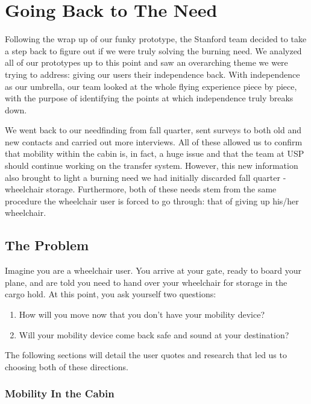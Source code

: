 \section{Going Back to The Need}
Following the wrap up of our funky prototype, the Stanford team decided to take a step back to figure out if we were truly solving the burning need. We analyzed all of our prototypes up to this point and saw an overarching theme we were trying to address: giving our users their independence back. With independence as our umbrella, our team looked at the whole flying experience piece by piece, with the purpose of identifying the points at which independence truly breaks down. 

We went back to our needfinding from fall quarter, sent surveys to both old and new contacts and carried out more interviews. All of these allowed us to confirm that mobility within the cabin is, in fact, a huge issue and that the team at USP should continue working on the transfer system. However, this new information also brought to light a burning need we had initially discarded fall quarter - wheelchair storage. Furthermore, both of these needs stem from the same procedure the wheelchair user is forced to go through: that of giving up his/her wheelchair. 

\subsection{The Problem}

Imagine you are a wheelchair user. You arrive at your gate, ready to board your plane, and are told you need to hand over your wheelchair for storage in the cargo hold. At this point, you ask yourself two questions: 
\begin{enumerate}
	\item How will you move now that you don't have your mobility device? 
	\item Will your mobility device come back safe and sound at your destination?
\end{enumerate}
The following sections will detail the user quotes and research that led us to choosing both of these directions.  
\\

\subsubsection*{Mobility In the Cabin}

